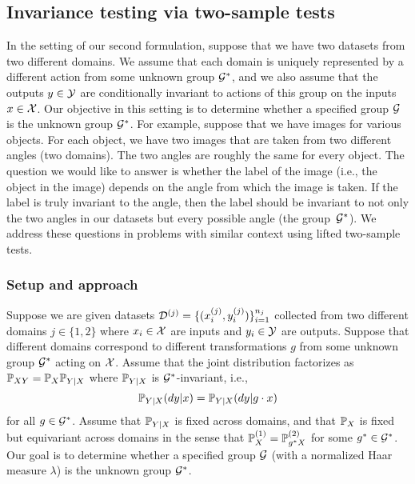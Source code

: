 \subsection{Invariance testing via two-sample tests} \label{sec:twosample}

In the setting of our second formulation, suppose that we have two datasets from two different domains. We assume that each domain is uniquely represented by a different action from some unknown group $\calG^*$, and we also assume that the outputs $y\in\calY$ are conditionally invariant to actions of this group on the inputs $x\in\calX$. Our objective in this setting is to determine whether a specified group $\calG$ is the unknown group $\calG^*$. For example, suppose that we have images for various objects. For each object, we have two images that are taken from two different angles (two domains). The two angles are roughly the same for every object. The question we would like to answer is whether the label of the image (i.e., the object in the image) depends on the angle from which the image is taken. If the label is truly invariant to the angle, then the label should be invariant to not only the two angles in our datasets but every possible angle (the group~$\calG^*$). We address these questions in problems with similar context using lifted two-sample tests.

\subsubsection{Setup and approach}

Suppose we are given datasets $\calD^{(j)}=\{(x_i^{(j)},y_i^{(j)})\}_{i=1}^{n_j}$ collected from two different domains $j\in\{1,2\}$ where $x_i\in\calX$ are inputs and $y_i\in\calY$ are outputs. Suppose that different domains correspond to different transformations $g$ from some unknown group $\calG^*$ acting on $\calX$. Assume that the joint distribution factorizes as $\P_{XY}=\P_X\P_{Y|X}$ where $\P_{Y|X}$ is $\calG^*$-invariant, i.e.,
\[
\bbP_{Y|X}(dy|x) = \bbP_{Y|X}(dy|g\cdot x)
\]
for all $g\in\calG^*$. Assume that $\P_{Y|X}$ is fixed across domains, and that $\P_X$ is fixed but equivariant across domains in the sense that $\P_X^{(1)}=\P_{g^*X}^{(2)}$ for some $g^*\in\calG^*$. Our goal is to determine whether a specified group $\calG$ (with a normalized Haar measure $\lambda$) is the unknown group $\calG^*$.
\\

